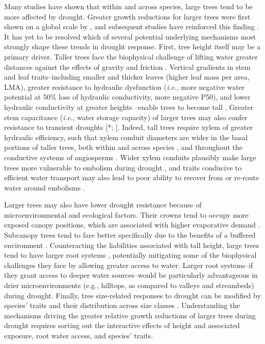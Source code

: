 \documentclass[
]{article}
\begin{document}
Many studies have shown that within and across species, large trees tend
to be more affected by drought. Greater growth reductions for larger
trees were first shown on a global scale by \citet{bennett_larger_2015},
and subsequent studies have reinforced this finding
\citep[\emph{e.g.},][]{hacket-pain_consistent_2016, gillerot_tree_2020}.
It has yet to be resolved which of several potential underlying
mechanisms most strongly shape these trends in drought response. First,
tree height itself may be a primary driver. Taller trees face the
biophysical challenge of lifting water greater distances against the
effects of gravity and friction
\citep{mcdowell_relationships_2011, mcdowell_darcys_2015, ryan_hydraulic_2006, couvreur_water_2018}.
Vertical gradients in stem and leaf traits--including smaller and
thicker leaves (higher leaf mass per area, LMA), greater resistance to
hydraulic dysfunction (\emph{i.e.}, more negative water potential at
50\% loss of hydraulic conductivity, more negative P50), and lower
hydraulic conductivity at greater heights
\citep{couvreur_water_2018, koike_leaf_2001, mcdowell_relationships_2011}--enable
trees to become tall \citep{couvreur_water_2018}. Greater stem
capacitance (\emph{i.e.}, water storage capacity) of larger trees may
also confer resistance to transient droughts
{[}\citet{phillips_reliance_2003}*; \citet{scholz_hydraulic_2011}{]}.
Indeed, tall trees require xylem of greater hydraulic efficiency, such
that xylem conduit diameters are wider in the basal portions of taller
trees, both within and across species
\citep{olson_plant_2018, liu_hydraulic_2019}, and throughout the
conductive systems of angiosperms
\citep{zach_vessel_2010, olson_universal_2014, olson_plant_2018}. Wider
xylem conduits plausibly make large trees more vulnerable to embolism
during drought \citep{olson_plant_2018}, and traits conducive to
efficient water transport may also lead to poor ability to recover from
or re-route water around embolisms \citep{roskilly_conflicting_2019}.

Larger trees may also have lower drought resistance because of
microenvironmental and ecological factors. Their crowns tend to occupy
more exposed canopy positions, which are associated with higher
evaporative demand \citep{kunert_revised_2017}. Subcanopy trees tend to
fare better specifically due to the benefits of a buffered environment
\citep{pretzsch_drought_2018}. Counteracting the liabilities associated
with tall height, large trees tend to have larger root systems
\citep{enquist_global_2002}, potentially mitigating some of the
biophysical challenges they face by allowing greater access to water.
Larger root systems--if they grant access to deeper water sources--would
be particularly advantageous in drier microenvironments (e.g., hilltops,
as compared to valleys and streambeds) during drought. Finally, tree
size-related responses to drought can be modified by species' traits and
their distribution across size classes
\citep{meakem_role_2018, liu_hydraulic_2019}. Understanding the
mechanisms driving the greater relative growth reductions of larger
trees during drought requires sorting out the interactive effects of
height and associated exposure, root water access, and species' traits.
\end{document}
